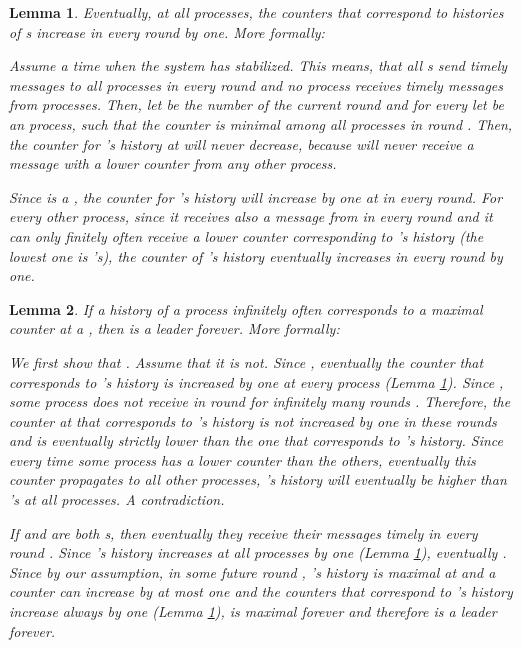 \documentclass[conference, compsoc]{IEEEtran}
\newtheorem{lemma}{Lemma}
\begin{document}
\begin{lemma}
 \label{lem:by1}
 Eventually, at all  processes, the counters that correspond to histories of s increase in every round by one. More formally:
 
 \begin{IEEEproof}
  Assume a time when the system has stabilized. This means, that all s send timely messages to all  processes in every round and no  process receives timely messages from  processes. Then, let  be the number of the current round and for every   let  be an  process, such that the counter  is minimal among all  processes in round . Then, the counter for 's history at  will never decrease, because  will never receive a message with a lower counter from any other process.
  
Since  is a , the counter for 's history will increase by one at  in every round. For every other  process, since it receives also a message from  in every round and it can only finitely often receive a lower counter corresponding to 's history (the lowest one is 's), the counter of 's history eventually increases in every round by one. 
 \end{IEEEproof}

\end{lemma}


\begin{lemma} \label{lem:infhigher}
If a history of a process  infinitely often corresponds to a maximal counter at a  , then  is a leader forever. More formally:
 
 
 \begin{IEEEproof}
 We first show that . Assume that it is not. Since , eventually the counter that corresponds to 's history is increased by one at every  process (Lemma \ref{lem:by1}). Since , some  process  does not receive  in round  for infinitely many rounds . Therefore, the counter at  that corresponds to 's history is not increased by one in these rounds and is eventually  strictly lower than the one that corresponds to 's history. Since every time some  process has a lower counter than the others, eventually this counter propagates to all other  processes, 's history will eventually be higher than 's at all  processes. A contradiction.
  
 If  and  are both s, then eventually they receive their messages timely in every round . Since 's history increases at all  processes by one (Lemma \ref{lem:by1}), eventually . Since by our assumption, in some future round , 's history is maximal at  and a counter can increase by at most one and the counters that correspond to 's history increase always by one (Lemma \ref{lem:by1}),  is maximal forever and therefore  is a leader forever.
 \end{IEEEproof}
\end{lemma}
\end{document}
